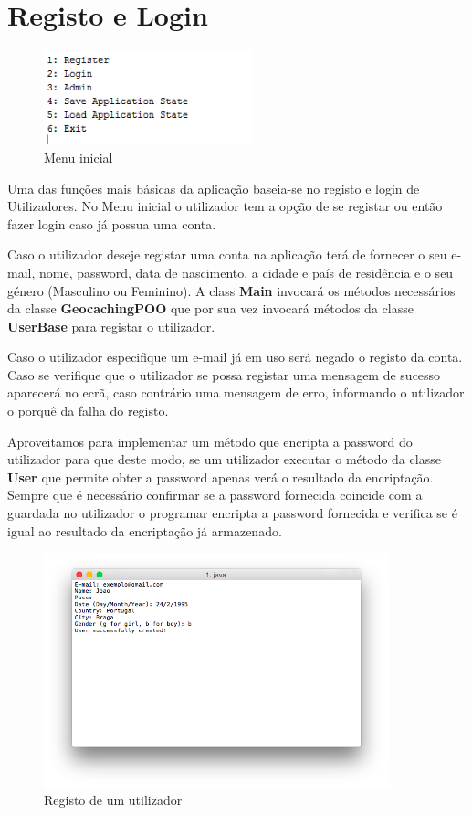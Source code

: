 \documentclass{article}
\begin{document}
\section{Registo e Login}
\begin{figure}[ht!]
\centering
\includegraphics[width=60mm]{menuprincipal.png}
\caption{Menu inicial}
\end{figure}
\par Uma das funções mais básicas da aplicação baseia-se no registo e login de Utilizadores. No Menu inicial o utilizador tem
a opção de se registar ou então fazer login caso já possua uma conta.
\par Caso o utilizador deseje registar uma conta na aplicação terá de fornecer o seu e-mail, nome, password,
data de nascimento, a cidade e país de residência e o seu género (Masculino ou Feminino). A class \textbf{Main} invocará
os métodos necessários da classe \textbf{GeocachingPOO} que por sua vez invocará métodos da classe
\textbf{UserBase} para registar o utilizador.
\par Caso o utilizador especifique um e-mail já em uso será negado o registo da conta. Caso se verifique que o utilizador se
possa registar uma mensagem de sucesso aparecerá no ecrã, caso contrário uma mensagem de erro, informando o utilizador
o porquê da falha do registo.
\par Aproveitamos para implementar um método que encripta a password do utilizador para que deste modo, se um utilizador
executar o método da classe \textbf{User} que permite obter a password apenas verá o resultado da encriptação.
Sempre que é necessário confirmar se a password fornecida coincide com a guardada no utilizador o programar encripta a password fornecida e verifica se é igual ao resultado da encriptação já armazenado.\\
\begin{figure}[ht!]
\centering
\includegraphics[width=100mm]{registo.png}
\caption{Registo de um utilizador}
\end{figure}
\end{document}
